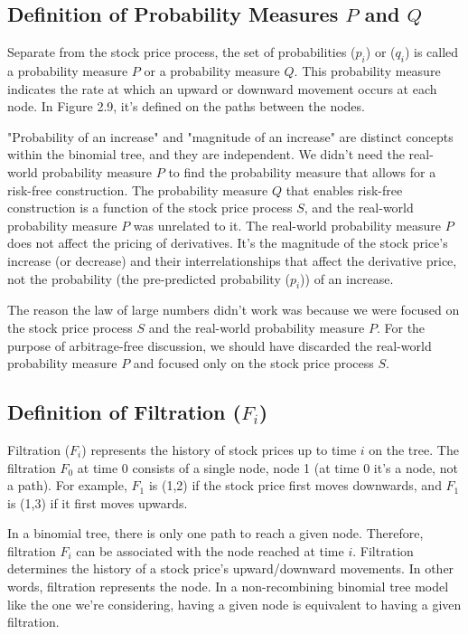\documentclass[uplatex,a4j,12pt,dvipdfmx]{jsarticle}
\begin{document}
\subsection{Definition of Probability Measures $P$ and $Q$}
Separate from the stock price process, the set of probabilities ($p_i$) or ($q_i$) is called a probability measure $P$ or a probability measure $Q$. This probability measure indicates the rate at which an upward or downward movement occurs at each node. In Figure 2.9, it's defined on the paths between the nodes.

"Probability of an increase" and "magnitude of an increase" are distinct concepts within the binomial tree, and they are independent. We didn't need the real-world probability measure $P$ to find the probability measure that allows for a risk-free construction. The probability measure $Q$ that enables risk-free construction is a function of the stock price process $S$, and the real-world probability measure $P$ was unrelated to it. The real-world probability measure $P$ does not affect the pricing of derivatives. It's the magnitude of the stock price's increase (or decrease) and their interrelationships that affect the derivative price, not the probability (the pre-predicted probability ($p_i$)) of an increase.

The reason the law of large numbers didn't work was because we were focused on the stock price process $S$ and the real-world probability measure $P$. For the purpose of arbitrage-free discussion, we should have discarded the real-world probability measure $P$ and focused only on the stock price process $S$.

\subsection{Definition of Filtration ($F_i$)}
Filtration ($F_i$) represents the history of stock prices up to time $i$ on the tree. The filtration $F_0$ at time 0 consists of a single node, node 1 (at time 0 it's a node, not a path). For example, $F_1$ is (1,2) if the stock price first moves downwards, and $F_1$ is (1,3) if it first moves upwards.

In a binomial tree, there is only one path to reach a given node. Therefore, filtration $F_i$ can be associated with the node reached at time $i$. Filtration determines the history of a stock price's upward/downward movements. In other words, filtration represents the node. In a non-recombining binomial tree model like the one we're considering, having a given node is equivalent to having a given filtration.
\end{document}
